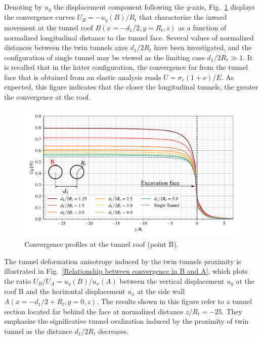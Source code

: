 \documentclass[a4paper,fleqn]{cas-sc}
\begin{document}
Denoting by $u_y$ the displacement component following the  $y$-axis, Fig.~\ref{Convergence Profiles in B} displays the convergence curves $U_B = -u_y(B)/R_t$ that characterize the inward movement at the tunnel roof $B(x=-d_1/2,y=R_t,z)$ as a function of normalized longitudinal distance to the tunnel face. Several values of normalized distances between the twin tunnels axes $d_1/2R_t$ have been investigated, and the configuration of single tunnel may be viewed as the limiting case $d_1/2R_t \gg 1$. It is recalled that in the latter configuration, the convergence far from the tunnel face that is obtained from an elastic analysis reads $U = \sigma_v(1+\nu)/E$. As expected, this figure indicates that the closer the longitudinal tunnels, the greater the convergence at the roof.
\begin{figure}[h!]
	\centering
	\includegraphics[scale=0.65]{Convergence Profiles in B.pdf}
	\caption{Convergence profiles at the tunnel roof (point B).}
	\label{Convergence Profiles in B}
\end{figure}
\FloatBarrier

The tunnel deformation anisotropy induced by the twin tunnels proximity is illustrated in Fig.~\ref{Relationship between convergence in B and A}, which plots the ratio $U_B/U_A = u_y(B)/u_x(A)$ between the vertical displacement $u_y$ at the roof B and the horizontal displacement $u_x$ at the side wall  $A(x=-d_1/2+R_t, y = 0, z)$. The results shown in this figure refer to a tunnel section located far behind the face at normalized distance $z/R_t = -25$. They emphasize the significative tunnel ovalization induced by the proximity of twin tunnel as the distance $d_1/2R_t$ decreases. 
\end{document}
